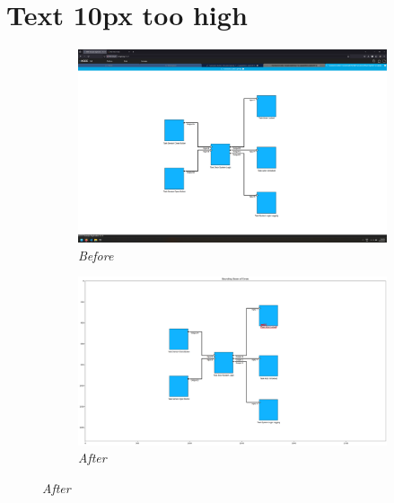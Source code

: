 \documentclass{article}
\begin{document}
\section{Text 10px too high}
\begin{figure}[H]
    \centering
    \begin{subfigure}[t]{0.9\textwidth}
        \centering
        \includegraphics[width=\textwidth]{testcases/text_10px_too_high/155614-795238_input_image.png}
        \caption*{\textit{Before}}
    \end{subfigure}
    \newline
    \begin{subfigure}[t]{0.9\textwidth}
        \centering
        \includegraphics[width=\textwidth]{testcases/text_10px_too_high/155634-666348_element_bbox_errors_labeled_colored.png}
        \caption*{\textit{After}}
    \end{subfigure}
    \label{fig:text_too_high_10}
\end{figure}
\newpage
\end{document}
